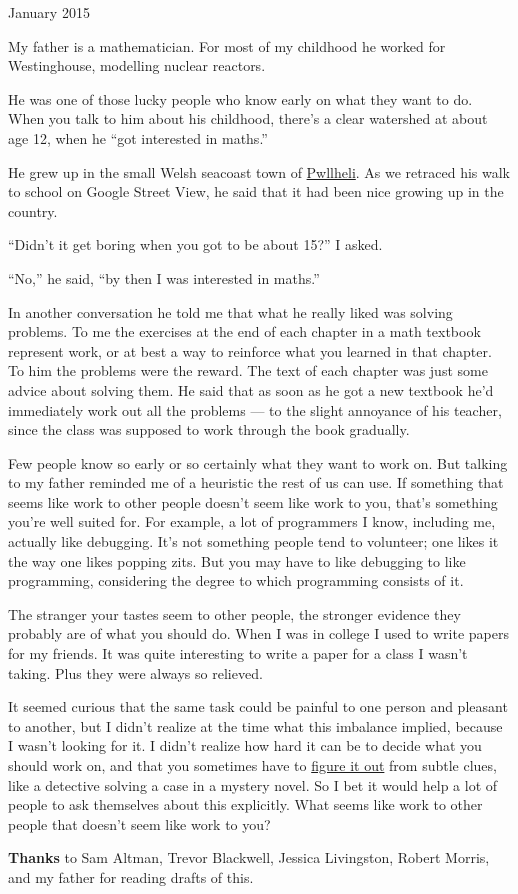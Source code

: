 January 2015

My father is a mathematician. For most of my childhood he worked for
Westinghouse, modelling nuclear reactors.

He was one of those lucky people who know early on what they want to do.
When you talk to him about his childhood, there's a clear watershed at
about age 12, when he ``got interested in maths.''

He grew up in the small Welsh seacoast town of
\href{https://goo.gl/maps/rkzUm}{Pwllheli}. As we retraced his walk to
school on Google Street View, he said that it had been nice growing up
in the country.

``Didn't it get boring when you got to be about 15?'' I asked.

``No,'' he said, ``by then I was interested in maths.''

In another conversation he told me that what he really liked was solving
problems. To me the exercises at the end of each chapter in a math
textbook represent work, or at best a way to reinforce what you learned
in that chapter. To him the problems were the reward. The text of each
chapter was just some advice about solving them. He said that as soon as
he got a new textbook he'd immediately work out all the problems --- to
the slight annoyance of his teacher, since the class was supposed to
work through the book gradually.

Few people know so early or so certainly what they want to work on. But
talking to my father reminded me of a heuristic the rest of us can use.
If something that seems like work to other people doesn't seem like work
to you, that's something you're well suited for. For example, a lot of
programmers I know, including me, actually like debugging. It's not
something people tend to volunteer; one likes it the way one likes
popping zits. But you may have to like debugging to like programming,
considering the degree to which programming consists of it.

The stranger your tastes seem to other people, the stronger evidence
they probably are of what you should do. When I was in college I used to
write papers for my friends. It was quite interesting to write a paper
for a class I wasn't taking. Plus they were always so relieved.

It seemed curious that the same task could be painful to one person and
pleasant to another, but I didn't realize at the time what this
imbalance implied, because I wasn't looking for it. I didn't realize how
hard it can be to decide what you should work on, and that you sometimes
have to \href{love.html}{figure it out} from subtle clues, like a
detective solving a case in a mystery novel. So I bet it would help a
lot of people to ask themselves about this explicitly. What seems like
work to other people that doesn't seem like work to you?

\textbf{Thanks} to Sam Altman, Trevor Blackwell, Jessica Livingston,
Robert Morris, and my father for reading drafts of this.
